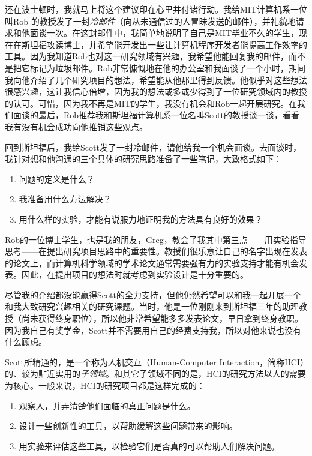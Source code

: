 \documentclass[letter,12pt]{book}
\begin{document}
\begin{CJK}{UTF8}{gbsn}
还在波士顿时，我就马上将这个建议印在心里并付诸行动。我给MIT计算机系一位叫Rob 的教授发了一封\emph{冷邮件}（向从未通信过的人冒昧发送的邮件），并礼貌地请求和他面谈一次。在这封邮件中，我简单地说明了自己是MIT毕业不久的学生，现在在斯坦福攻读博士，并希望能开发出一些让计算机程序开发者能提高工作效率的工具。因为我知道Rob也对这一研究领域有兴趣，我希望他能回复我的邮件，而不是把它标记为垃圾邮件。Rob非常慷慨地在他的办公室和我面谈了一个小时，期间我向他介绍了几个研究项目的想法，希望能从他那里得到反馈。他似乎对这些想法很感兴趣，这让我信心倍增，因为我的想法或多或少得到了一位研究领域内的教授的认可。可惜，因为我不再是MIT的学生，我没有机会和Rob一起开展研究。在我们面谈的最后，Rob推荐我和斯坦福计算机系一位名叫Scott的教授谈一谈，看看我有没有机会成功向他推销这些观点。

回到斯坦福后，我给Scott发了一封冷邮件，请他给我一个机会面谈。去面谈时，我针对想和他沟通的三个具体的研究思路准备了一些笔记，大致格式如下：

\begin{enumerate}
\item 问题的定义是什么？
\item 我准备用什么方法解决？
\item 用什么样的实验，才能有说服力地证明我的方法具有良好的效果？
\end{enumerate}

Rob的一位博士学生，也是我的朋友，Greg，教会了我其中第三点——用实验指导思考——在提出研究项目思路中的重要性。教授们很乐意让自己的名字出现在发表的论文上，而计算机科学领域的学术论文通常需要强有力的实验支持才能有机会发表。因此，在提出项目的想法时就考虑到实验设计是十分重要的。

尽管我的介绍都没能赢得Scott的全力支持，但他仍然希望可以和我一起开展一个和我大致研究兴趣相关的研究课题。当时，他是一位刚刚来到斯坦福三年的助理教授（尚未获得终身职位），所以他非常希望能多多发表论文，早日拿到终身教职。因为我自己有奖学金，Scott并不需要用自己的经费支持我，所以对他来说也没有什么顾虑。

\breakline

Scott所精通的，是一个称为人机交互（Human-Computer Interaction，简称HCI）的、较为贴近实用的\emph{子领域}。和其它子领域不同的是，HCI的研究方法以人的需要为核心。一般来说，HCI的研究项目都是这样完成的：

\begin{enumerate}
\item 观察人，并弄清楚他们面临的真正问题是什么。
\item 设计一些创新性的工具，以帮助缓解这些问题带来的影响。
\item 用实验来评估这些工具，以检验它们是否真的可以帮助人们解决问题。
\end{enumerate}


\end{CJK}
\end{document}
